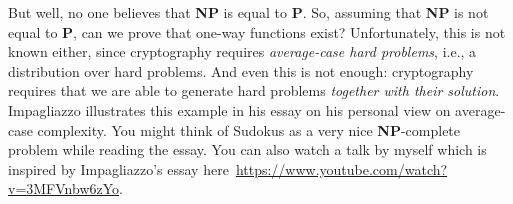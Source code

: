 \documentclass[a4paper,table,dvipsnames]{article}
\theoremstyle{definition}
\begin{document}
But well, no one believes that \textbf{NP} is equal to \textbf{P}. So, assuming that \textbf{NP} is not equal to \textbf{P}, can we prove that one-way functions exist? Unfortunately, this is not known either, since cryptography requires \emph{average-case hard problems}, i.e., a distribution over hard problems. And even this is not enough: cryptography requires that we are able to generate hard problems \emph{together with their solution}. Impagliazzo illustrates this example in his essay on his personal view on average-case complexity. You might think of Sudokus as a very nice \textbf{NP}-complete problem while reading the essay. You can also watch a talk by myself which is inspired by Impagliazzo's essay here~\url{https://www.youtube.com/watch?v=3MFVnbw6zYo}.
\end{document}
